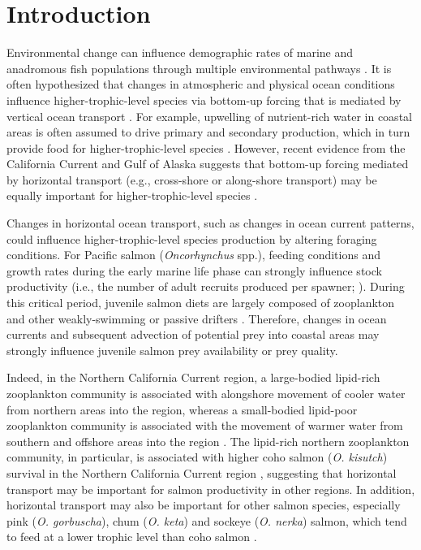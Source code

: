 \section{Introduction}

Environmental change can influence demographic rates of marine and anadromous
fish populations through multiple environmental pathways \citep{Ottersen2010a,
Drinkwater2010a}. It is often hypothesized that changes in atmospheric and
physical ocean conditions influence higher-trophic-level species via bottom-up
forcing that is mediated by vertical ocean transport \citep{Malick2015b,
DiLorenzo2013b, Ottersen2010a}. For example, upwelling of nutrient-rich water in
coastal areas is often assumed to drive primary and secondary production, which
in turn provide food for higher-trophic-level species \citep{Rykaczewski2008a}.
However, recent evidence from the California Current \citep{Bi2011b,
Keister2011a, Sydeman2011a} and Gulf of Alaska \citep{Stabeno2004a, Combes2009a,
Kline2010, Kline2008a} suggests that bottom-up forcing mediated by horizontal
transport (e.g., cross-shore or along-shore transport) may be equally important
for higher-trophic-level species \citep{DiLorenzo2013b}.

Changes in horizontal ocean transport, such as changes in ocean current
patterns, could influence higher-trophic-level species production by altering
foraging conditions. For Pacific salmon (\emph{Oncorhynchus} spp.), feeding
conditions and growth rates during the early marine life phase can strongly
influence stock productivity (i.e., the number of adult recruits produced per
spawner; \citealp{McGurk1996a, Farley2007b, Duffy2011, Malick2011a}). During this
critical period, juvenile salmon diets are largely composed of zooplankton and
other weakly-swimming or passive drifters \citep{Armstrong2008a, Beauchamp2007a,
Brodeur2007a}. Therefore, changes in ocean currents and subsequent advection of
potential prey into coastal areas may strongly influence juvenile salmon prey
availability or prey quality.

Indeed, in the Northern California Current region, a large-bodied lipid-rich
zooplankton community is associated with alongshore movement of cooler water
from northern areas into the region, whereas a small-bodied lipid-poor
zooplankton community is associated with the movement of warmer water from
southern and offshore areas into the region \citep{Bi2011b, Keister2011a}. The
lipid-rich northern zooplankton community, in particular, is associated with
higher coho salmon (\emph{O. kisutch}) survival in the Northern California
Current region \citep{Bi2011a}, suggesting that horizontal transport may be
important for salmon productivity in other regions. In addition, horizontal
transport may also be important for other salmon species, especially pink
(\emph{O. gorbuscha}), chum (\emph{O. keta}) and sockeye (\emph{O. nerka})
salmon, which tend to feed at a lower trophic level than coho salmon
\citep{Brodeur2007}.

